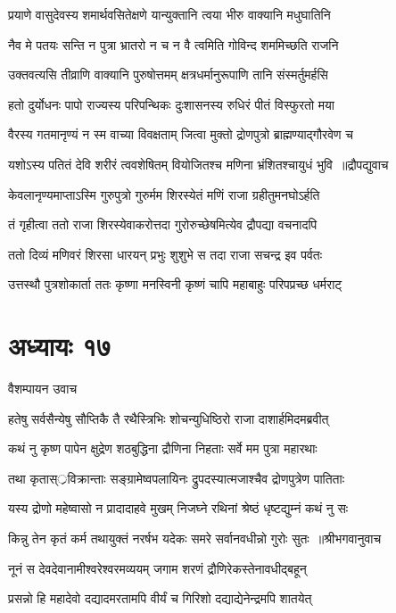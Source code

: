 \twolineshloka
{प्रयाणे वासुदेवस्य शमार्थवसितेक्षणे}
{यान्युक्तानि त्वया भीरु वाक्यानि मधुघातिनि}


\twolineshloka
{नैव मे पतयः सन्ति न पुत्रा भ्रातरो न च}
{न वै त्वमिति गोविन्द शममिच्छति राजनि}


\twolineshloka
{उक्तवत्यसि तीव्राणि वाक्यानि पुरुषोत्तमम्}
{क्षत्रधर्मानुरूपाणि तानि संस्मर्तुमर्हसि}


\twolineshloka
{हतो दुर्योधनः पापो राज्यस्य परिपन्थिकः}
{दुःशासनस्य रुधिरं पीतं विस्फुरतो मया}


\twolineshloka
{वैरस्य गतमानृण्यं न स्म वाच्या विवक्षताम्}
{जित्वा मुक्तो द्रोणपुत्रो ब्राह्मण्याद्गौरवेण च}


\threelineshloka
{यशोऽस्य पतितं देवि शरीरं त्ववशेषितम्}
{वियोजितश्च मणिना भ्रंशितश्चायुधं भुवि ॥द्रौपद्युवाच}
{}


\twolineshloka
{केवलानृण्यमाप्ताऽस्मि गुरुपुत्रो गुरुर्मम}
{शिरस्येतं मणिं राजा ग्रहीतुमनघोऽर्हति}


\twolineshloka
{तं गृहीत्वा ततो राजा शिरस्येवाकरोत्तदा}
{गुरोरुच्छेषमित्येव द्रौपद्या वचनादपि}


\twolineshloka
{ततो दिव्यं मणिवरं शिरसा धारयन् प्रभुः}
{शुशुभे स तदा राजा सचन्द्र इव पर्वतः}


\twolineshloka
{उत्तस्थौ पुत्रशोकार्ता ततः कृष्णा मनस्विनी}
{कृष्णं चापि महाबाहुः परिपप्रच्छ धर्मराट्}


\chapter{अध्यायः १७}
\twolineshloka
{वैशम्पायन उवाच}
{}


\twolineshloka
{हतेषु सर्वसैन्येषु सौप्तिकै तै रथैस्त्रिभिः}
{शोचन्युधिष्ठिरो राजा दाशार्हमिदमब्रवीत्}


\twolineshloka
{कथं नु कृष्ण पापेन क्षुद्रेण शठबुद्धिना}
{द्रौणिना निहताः सर्वे मम पुत्रा महारथाः}


\twolineshloka
{तथा कृतास््रविक्रान्ताः सङ्ग्रामेष्वपलायिनः}
{द्रुपदस्यात्मजाश्चैव द्रोणपुत्रेण पातिताः}


\twolineshloka
{यस्य द्रोणो महेष्वासो न प्रादादाहवे मुखम्}
{निजघ्ने रथिनां श्रेष्ठं धृष्टद्युम्नं कथं नु सः}


\threelineshloka
{किन्नु तेन कृतं कर्म तथायुक्तं नरर्षभ}
{यदेकः समरे सर्वानवधीन्नो गुरोः सुतः ॥श्रीभगवानुवाच}
{}


\twolineshloka
{नूनं स देवदेवानामीश्वरेश्वरमव्ययम्}
{जगाम शरणं द्रौणिरेकस्तेनावधीद्बहून्}


\twolineshloka
{प्रसन्नो हि महादेवो दद्यादमरतामपि}
{वीर्यं च गिरिशो दद्याद्येनेन्द्रमपि शातयेत्}


